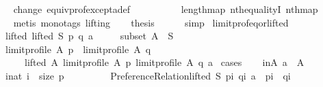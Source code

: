 \begin{isabellebody}
\ \ \ \ \isamarkupfalse%
\ change\ equiv{\isacharunderscore}{\kern0pt}prof{\isacharunderscore}{\kern0pt}except{\isacharunderscore}{\kern0pt}a{\isacharunderscore}{\kern0pt}def\isanewline
\ \ \ \ \ \ \ \ \ \ length{\isacharunderscore}{\kern0pt}map\ nth{\isacharunderscore}{\kern0pt}equalityI\ nth{\isacharunderscore}{\kern0pt}map\isanewline
\ \ \ \ \isamarkupfalse%
\ {\isacharparenleft}{\kern0pt}metis\ {\isacharparenleft}{\kern0pt}mono{\isacharunderscore}{\kern0pt}tags{\isacharcomma}{\kern0pt}\ lifting{\isacharparenright}{\kern0pt}{\isacharparenright}{\kern0pt}\isanewline
\ \ \isamarkupfalse%
\ {\isacharquery}{\kern0pt}thesis\isanewline
\ \ \ \ \isamarkupfalse%
\ simp\isanewline
{}\isamarkupfalse%
%
\endisatagproof
{\isafoldproof}%
%
\isadelimproof
\isanewline
%
\endisadelimproof
\isanewline
{}\isamarkupfalse%
\ limit{\isacharunderscore}{\kern0pt}prof{\isacharunderscore}{\kern0pt}eq{\isacharunderscore}{\kern0pt}or{\isacharunderscore}{\kern0pt}lifted{\isacharcolon}{\kern0pt}\isanewline
\ \ \isanewline
\ \ \ \ lifted{\isacharcolon}{\kern0pt}\ {\isachardoublequoteopen}lifted\ S\ p\ q\ a{\isachardoublequoteclose}\ \isanewline
\ \ \ \ subset{\isacharcolon}{\kern0pt}\ {\isachardoublequoteopen}A\ {\isasymsubseteq}\ S{\isachardoublequoteclose}\isanewline
\ \ \isanewline
\ \ \ \ {\isachardoublequoteopen}limit{\isacharunderscore}{\kern0pt}profile\ A\ p\ {\isacharequal}{\kern0pt}\ limit{\isacharunderscore}{\kern0pt}profile\ A\ q\ {\isasymor}\isanewline
\ \ \ \ \ \ \ \ lifted\ A\ {\isacharparenleft}{\kern0pt}limit{\isacharunderscore}{\kern0pt}profile\ A\ p{\isacharparenright}{\kern0pt}\ {\isacharparenleft}{\kern0pt}limit{\isacharunderscore}{\kern0pt}profile\ A\ q{\isacharparenright}{\kern0pt}\ a{\isachardoublequoteclose}\isanewline
%
\isadelimproof
%
\endisadelimproof
%
\isatagproof
{}\isamarkupfalse%
\ cases\isanewline
\ \ \isamarkupfalse%
\ inA{\isacharcolon}{\kern0pt}\ {\isachardoublequoteopen}a\ {\isasymin}\ A{\isachardoublequoteclose}\isanewline
\ \ \isamarkupfalse%
\isanewline
\ \ \ \ {\isachardoublequoteopen}{\isasymforall}i{\isacharcolon}{\kern0pt}{\isacharcolon}{\kern0pt}nat{\isachardot}{\kern0pt}\ i\ {\isacharless}{\kern0pt}\ size\ p\ {\isasymlongrightarrow}\isanewline
\ \ \ \ \ \ \ \ {\isacharparenleft}{\kern0pt}Preference{\isacharunderscore}{\kern0pt}Relation{\isachardot}{\kern0pt}lifted\ S\ {\isacharparenleft}{\kern0pt}p{\isacharbang}{\kern0pt}i{\isacharparenright}{\kern0pt}\ {\isacharparenleft}{\kern0pt}q{\isacharbang}{\kern0pt}i{\isacharparenright}{\kern0pt}\ a\ {\isasymor}\ {\isacharparenleft}{\kern0pt}p{\isacharbang}{\kern0pt}i{\isacharparenright}{\kern0pt}\ {\isacharequal}{\kern0pt}\ {\isacharparenleft}{\kern0pt}q{\isacharbang}{\kern0pt}i{\isacharparenright}{\kern0pt}{\isacharparenright}{\kern0pt}{\isachardoublequoteclose}\isanewline

\end{isabellebody}
